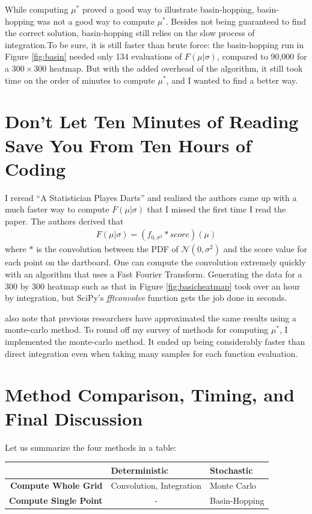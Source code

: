 \documentclass[]{article}
\newcommand{\mustar}{\ensuremath{\mu^* }}
\begin{document}
While computing $\mu^*$ proved a good way to illustrate basin-hopping, basin-hopping was not a good way to compute $\mu^*$. Besides not being guaranteed to find the correct solution, basin-hopping still relies on the slow process of integration.To be sure, it is still faster than brute force: the basin-hopping run in Figure \ref{fig:basin} needed only 134 evaluations of $F(\mu \vert \sigma)$, compared to 90,000 for a $300 \times 300$ heatmap. But with the added overhead of the algorithm, it still took time on the order of minutes to compute $\mu^*$, and I wanted to find a better way.

\section{Don't Let Ten Minutes of Reading Save You From Ten Hours of Coding}
I reread ``A Statistician Playes Darts''\cite{stat} and realized the authors came up with a much faster way to compute $F(\mu \vert \sigma)$ that I missed the first time I read the paper. The authors derived that
\begin{align}
	F(\mu \vert \sigma)  =(f_{0, \sigma^2} * score)(\mu)
\end{align}
 where $*$ is the convolution between the PDF of $\mathcal{N}(0, \sigma^2)$ and the score value for each point on the dartboard\cite{stat}. One can compute the convolution extremely quickly with an algorithm that uses a Fast Fourier Transform. Generating the data for a 300 by 300 heatmap such as that in Figure \ref{fig:basicheatmap} took over an hour by integration, but SciPy's \textit{fftconvolve} function gets the job done in seconds. 

\citeauthor{stat} also note that previous researchers have approximated the same results using a monte-carlo method\cite{stat}. To round off my  survey of methods for computing \mustar, I implemented the monte-carlo method. It ended up being considerably faster than direct integration even when taking many samples for each function evaluation. 

\section{Method Comparison, Timing, and Final Discussion}\label{sec:timing}

Let us summarize the four methods in a table:

\begin{table}[h]
	\centering
	\begin{tabular}{r  l l}
		& \textbf{Deterministic} & \textbf{Stochastic} \\ \hline
		\textbf{Compute Whole Grid} \vline& Convolution, Integration & Monte Carlo \\
		\textbf{Compute Single Point} \vline& \multicolumn{1}{c}{-} & Basin-Hopping
	\end{tabular}
\end{table}
\end{document}
